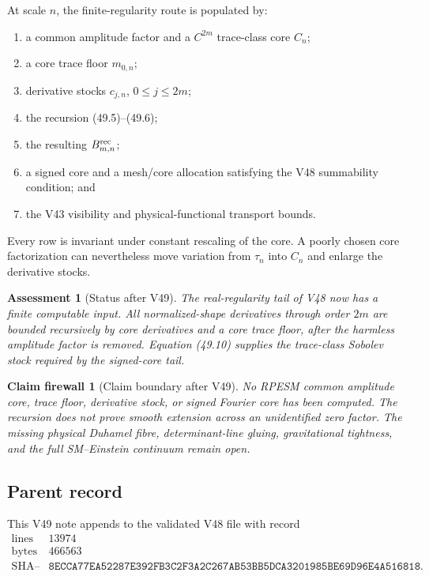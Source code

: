 \documentclass[11pt]{article}
\newtheorem{firewall}[theorem]{Claim firewall}
\newtheorem{assessment}[theorem]{Assessment}
\theoremstyle{remark}
\begin{document}
At scale \(n\), the finite-regularity route is populated by:
\begin{enumerate}
\item a common amplitude factor and a \(C^{2m}\) trace-class core
\(C_n\);
\item a core trace floor \(m_{0,n}\);
\item derivative stocks \(c_{j,n}\), \(0\leq j\leq2m\);
\item the recursion (49.5)--(49.6);
\item the resulting \(B_{m,n}^{\rm rec}\);
\item a signed core and a mesh/core allocation satisfying the V48
summability condition; and
\item the V43 visibility and physical-functional transport bounds.
\end{enumerate}

Every row is invariant under constant rescaling of the core.  A
poorly chosen core factorization can nevertheless move variation
from \(\tau_n\) into \(C_n\) and enlarge the derivative stocks.

\begin{assessment}[Status after V49]
\label{ass:v12v49-status}
The real-regularity tail of V48 now has a finite computable input.
All normalized-shape derivatives through order \(2m\) are bounded
recursively by core derivatives and a core trace floor, after the
harmless amplitude factor is removed.  Equation (49.10) supplies the
trace-class Sobolev stock required by the signed-core tail.
\end{assessment}

\begin{firewall}[Claim boundary after V49]
\label{fire:v12v49-claim}
No RPESM common amplitude core, trace floor, derivative stock, or
signed Fourier core has been computed.  The recursion does not prove
smooth extension across an unidentified zero factor.  The missing
physical Duhamel fibre, determinant-line gluing, gravitational
tightness, and the full SM--Einstein continuum remain open.
\end{firewall}

\subsection{Parent record}

This V49 note appends to the validated V48 file with record
\[
\begin{array}{c|c}
\text{lines}&13974\\
\text{bytes}&466563\\
\text{SHA--256}&
\texttt{8ECCA77EA52287E392FB3C2F3A2C267AB53BB5DCA3201985BE69D96E4A516818}.
\end{array}
\]
\end{document}
